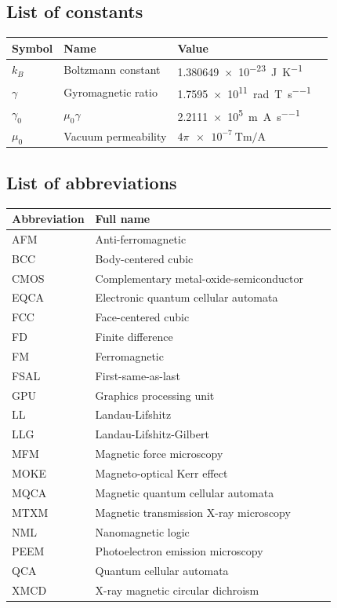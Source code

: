\documentclass[11pt,a4paper,english,twoside]{article}
\begin{document}
\vspace*{\fill}
\cleardoublepage

\cleardoublepage
{\hypersetup{linkcolor=black}
\setcounter{tocdepth}{2}
\tableofcontents
}
\newpage
\subsection*{List of constants}
\begin{longtable}{llll}
\toprule
\bfseries Symbol & \bfseries Name &
\bfseries Value \\\midrule\endhead
$k_B$ & Boltzmann constant & \SI{1.380649e-23}{\joule\per\kelvin} \\
\midrule
$\gamma$ & Gyromagnetic ratio & \SI{1.7595e11}{\radian\per\tesla\per\second} \\
$\gamma_0$ & $\mu_0 \gamma$ & \SI{2.2111e5}{\metre\per\ampere\per\second} \\
$\mu_0$ & Vacuum permeability & $4\pi\SI{e-7}{\tesla\metre\per\ampere}$ \\
\bottomrule
\end{longtable}

\subsection*{List of abbreviations}
\begin{longtable}{llll}
\toprule
\bfseries Abbreviation & \bfseries Full name \\\midrule\endhead
AFM & Anti-ferromagnetic \\
BCC & Body-centered cubic \\
CMOS & Complementary metal-oxide-semiconductor \\
EQCA & Electronic quantum cellular automata \\
FCC & Face-centered cubic \\
FD & Finite difference \\
FM & Ferromagnetic \\
FSAL & First-same-as-last \\
GPU & Graphics processing unit \\
LL & Landau-Lifshitz \\
LLG & Landau-Lifshitz-Gilbert \\
MFM & Magnetic force microscopy \\
MOKE & Magneto-optical Kerr effect \\
MQCA & Magnetic quantum cellular automata \\
MTXM & Magnetic transmission X-ray microscopy \\
NML & Nanomagnetic logic \\
PEEM & Photoelectron emission microscopy \\
QCA & Quantum cellular automata \\
XMCD & X-ray magnetic circular dichroism \\
\bottomrule
\end{longtable}
\end{document}
